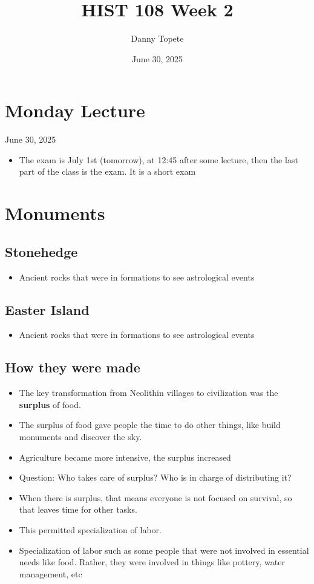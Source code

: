 \documentclass{article}
\title{HIST 108 Week 2}
\author{Danny Topete}
\date{June 30, 2025}
\begin{document}
\section*{Monday Lecture}
June 30, 2025

\begin{itemize}
  \item The exam is July 1st (tomorrow), at 12:45 after
    some lecture, then the last part of the class
    is the exam.
    It is a short exam
\end{itemize}

\section{Monuments}

\subsection{Stonehedge}

\begin{itemize}
  \item Ancient rocks that were in formations to see
    astrological events
\end{itemize}

\subsection{Easter Island}
\begin{itemize}
  \item Ancient rocks that were in formations to see
    astrological events
\end{itemize}


\subsection{How they were made}
\begin{itemize}
  \item The key transformation from Neolithin villages
    to civilization was the \textbf{surplus} of food.
  \item The surplus of food gave people the time to
    do other things, like build monuments and discover the sky.
  \item Agriculture became more intensive, the surplus increased
  \item Question: Who takes care of surplus? Who is in
    charge of distributing it?
  \item When there is surplus, that means everyone is not
    focused on survival, so that leaves time for other tasks.
  \item This permitted specialization of labor.
  \item Specialization of labor such as some people
    that were not involved in essential needs like food.
    Rather, they were involved in things like pottery,
    water management, etc
\end{itemize}
\end{document}
